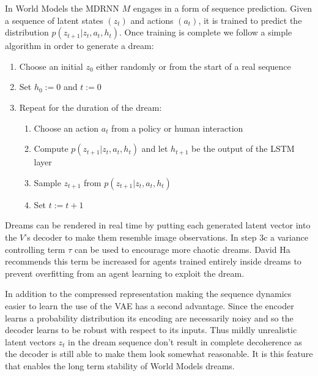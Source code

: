 \documentclass{article}
\numberwithin{figure}{section}
\theoremstyle{definition}
\begin{document}
In World Models the MDRNN $M$ engages in a form of sequence prediction.
Given a sequence of latent states $(z_t)$ and actions $(a_t)$, it is trained to predict the distribution $p(z_{t+1} | z_t, a_t, h_t)$.
Once training is complete we follow a simple algorithm in order to generate a dream:
\begin{enumerate}
  \item Choose an initial $z_0$ either randomly or from the start of a real sequence 
  \item Set $h_0 := 0$ and $t:=0$
  \item Repeat for the duration of the dream:
  \begin{enumerate}
    \item Choose an action $a_t$ from a policy or human interaction
    \item Compute $p(z_{t+1} | z_t, a_t, h_t)$ and let $h_{t+1}$ be the output of the LSTM layer
    \item Sample $z_{t+1}$ from $p(z_{t+1} | z_t, a_t, h_t)$
    \item Set $t := t+1$
  \end{enumerate}
\end{enumerate}
Dreams can be rendered in real time by putting each generated latent vector into the $V$'s decoder to make them resemble image observations.
In step 3c a variance controlling term $\tau$ can be used to encourage more chaotic dreams.
David Ha recommends this term be increased for agents trained entirely inside dreams to prevent overfitting from an agent learning to exploit the dream.

In addition to the compressed representation making the sequence dynamics easier to learn the use of the VAE has a second advantage.
Since the encoder learns a probability distribution its encoding are necessarily noisy and so the decoder learns to be robust with respect to its inputs.
Thus mildly unrealistic latent vectors $z_t$ in the dream sequence don't result in complete decoherence as the decoder is still able to make them look somewhat reasonable.
It is this feature that enables the long term stability of World Models dreams.
\end{document}
